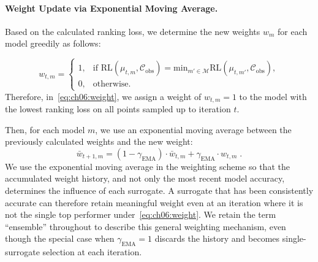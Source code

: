 \paragraph{Weight Update via Exponential Moving Average.}
Based on the calculated ranking loss, we determine the new weights
${w}_m$
for each model greedily as follows:

\begin{equation}\label{eq:ch06:weight}
    {w}_{t,m} =
    \begin{cases}
        1, & \text{if } \text{RL}(\mu_{t,m}, \mathcal C_{\mathrm{obs}}) = \text{min}_{m\prime\in\mathcal M} \text{RL}(\mu_{t,m\prime}, \mathcal C_{\mathrm{obs}}), \\
        0, & \text{otherwise}.
    \end{cases}
\end{equation}
Therefore, in~\cref{eq:ch06:weight},
we assign a weight of ${w}_{t,m} = 1$ to the model
with the lowest ranking loss on all points sampled up to iteration $t$.

Then, for each model $m$, we use an exponential moving average between the previously calculated weights and the new weight:
\begin{equation}
    \bar{w}_{t+1,m} = (1-\gamma_{\mathrm{EMA}}) \cdot \bar{w}_{t, m} + \gamma_{\mathrm{EMA}}  \cdot {w}_{t,m} \; .
    \label{eq:ch06:weight_ema}
\end{equation}
We use the exponential moving average in the weighting scheme so that the accumulated weight history, and not only the most recent model accuracy, determines the influence of each surrogate.
A surrogate that has been consistently accurate can therefore retain meaningful weight even at an iteration where it is not the single top performer under~\cref{eq:ch06:weight}. We retain the term ``ensemble'' throughout to describe this general weighting mechanism, even though the special case when $\gamma_{\mathrm{EMA}} = 1$ discards the history and becomes single-surrogate selection at each iteration.

